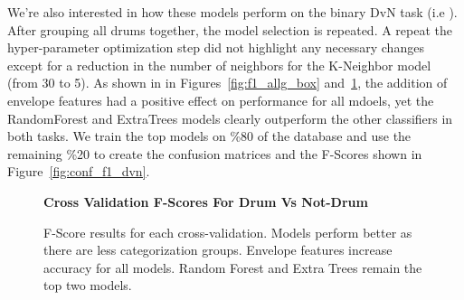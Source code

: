 \documentclass[\main/thesis.tex]{subfiles}
\begin{document}
We're also interested in how these models perform on the binary DvN task (i.e \decfirst).
After grouping all drums together, the model selection is repeated. A repeat the hyper-parameter optimization step did not highlight any necessary changes except for a reduction in the number of neighbors for the K-Neighbor model (from 30 to 5). As shown in in Figures~\ref{fig:f1_allg_box} and~\ref{fig:f1_dvn_box}, the addition of envelope features had a positive effect on performance for all mdoels, yet the RandomForest and ExtraTrees models clearly outperform the other classifiers in both tasks. We train the top models on \%80 of the database and use the remaining \%20 to create the confusion matrices and the F-Scores shown in Figure~\ref{fig:conf_f1_dvn}.
\begin{figure}[h!]   
    \begin{center}
        \textbf{Cross Validation F-Scores For Drum Vs Not-Drum}
    \caption{F-Score results for each cross-validation. Models perform better as there are less categorization groups. Envelope features increase accuracy for all models. Random Forest and Extra Trees remain the top two models. }
    \label{fig:f1_dvn_box}
    \end{center}
\end{figure}
\end{document}
